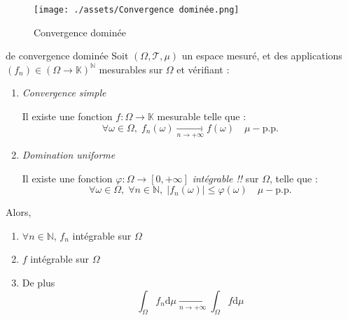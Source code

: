 \begin{figure}[H] %
  \centering
  \texttt{[image: ./assets/Convergence dominée.png]}
  \caption{Convergence dominée}
  \label{fig:Convergence dominée}
\end{figure}


\begin{Theorem}{
    \color{red} de convergence dominée
  }{}
  Soit $(\Omega, \mathcal{T}, \mu)$ un espace mesuré, et des applications $(f_n) \in (\Omega \to \mathbb{K}) ^{\mathbb{N}}$ mesurables sur $\Omega$ et vérifiant : 
  \begin{enumerate}

      \item \textit{Convergence simple} 

        Il existe une fonction $f: \Omega \to \mathbb{K}$ mesurable telle que : 
        \begin{equation}
          \forall \omega \in \Omega, \; f_n(\omega)  \underset{n \to + \infty}{\longrightarrow} f(\omega) \quad \mu-\text{p.p.}
        \end{equation}

      \item \textit{Domination uniforme} 

        Il existe une fonction $\varphi : \Omega \to [0, + \infty]$ {\color{red} \textit{intégrable !!}} sur $\Omega$, telle que :
        \begin{equation}
          \forall \omega \in \Omega, \; \forall n \in \mathbb{N},\;  |f_n(\omega) | \le \varphi(\omega) \quad \mu-\text{p.p.}
        \end{equation}
  \end{enumerate}

  Alors, 
  \begin{enumerate}

      \item $\forall n \in \mathbb{N}$, $f_n$ intégrable sur $\Omega$ 
      \item $f$ intégrable sur $\Omega$ 
      \item De plus 
        \begin{equation}
          \int_{\Omega}^{} f_n \mathrm{d}\mu  \underset{n \to + \infty}{\longrightarrow} \int_{\Omega}^{} f \mathrm{d}\mu
        \end{equation}

  \end{enumerate}

\end{Theorem}

